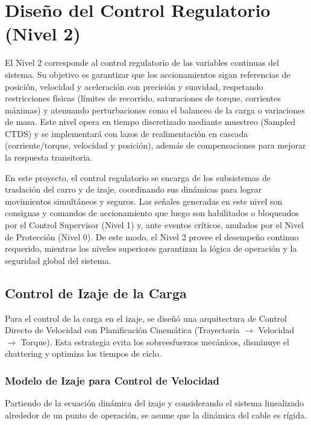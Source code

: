 \documentclass[11pt]{article}                                    %
\begin{document}
\section{Diseño del Control Regulatorio (Nivel 2)}
El Nivel 2 corresponde al control regulatorio de las variables continuas del sistema. Su objetivo es garantizar que los accionamientos sigan referencias de posición, velocidad y aceleración con precisión y suavidad, respetando restricciones físicas (límites de recorrido, saturaciones de torque, corrientes máximas) y atenuando perturbaciones como el balanceo de la carga o variaciones de masa. Este nivel opera en tiempo discretizado mediante muestreo (Sampled CTDS) y se implementará con lazos de realimentación en cascada (corriente/torque, velocidad y posición), además de compensaciones para mejorar la respuesta transitoria.

En este proyecto, el control regulatorio se encarga de los subsistemas de traslación del carro y de izaje, coordinando sus dinámicas para lograr movimientos simultáneos y seguros. Las señales generadas en este nivel son consignas y comandos de accionamiento que luego son habilitados o bloqueados por el Control Supervisor (Nivel 1) y, ante eventos críticos, anulados por el Nivel de Protección (Nivel 0). De este modo, el Nivel 2 provee el desempeño continuo requerido, mientras los niveles superiores garantizan la lógica de operación y la seguridad global del sistema.

\subsection{Control de Izaje de la Carga}
Para el control de la carga en el izaje, se diseñó una arquitectura de Control Directo de Velocidad con Planificación Cinemática (Trayectoria $\to$ Velocidad $\to$ Torque). Esta estrategia evita los sobreesfuerzos mecánicos, disminuye el chattering y optimiza los tiempos de ciclo.

\subsubsection{Modelo de Izaje para Control de Velocidad}
Partiendo de la ecuación dinámica del izaje y considerando el sistema linealizado alrededor de un punto de operación, se asume que la dinámica del cable es rígida. 
\end{document}
